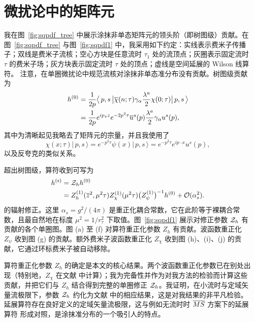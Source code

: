 \section{\label{sec:pertth}微扰论中的矩阵元}

我在图~\ref{fig:sqpdf_tree} 中展示涂抹非单态矩阵元的领头阶（即树图级）贡献。在图~\ref{fig:sqpdf_tree} 与图~\ref{fig:sqpdf1} 中，我采用如下约定：实线表示费米子传播子；双线是费米子流核；空心方块是任意流时 $\tau_1$ 处的流顶点；灰圈表示固定流时 $\tau$ 的费米子场；灰方块表示固定流时 $\tau$ 处的顶点；虚线是空间延展的 Wilson 线算符。
注意，在单圈微扰论中规范流核对涂抹非单态准分布没有贡献。树图级贡献为
\begin{align}
h^{(0)} = {} & \frac{1}{2p}\big\langle  \,p,s \,\big| \overline{\chi}(n;\tau)\gamma_\alpha\frac{\lambda^a}{2}\chi(0;\tau) \big|\, p,s \, \big\rangle \nonumber\\
= {} & \frac{1}{2p}e^{ip_zz} e^{-2p^2\tau}\overline{u}^s(p)\frac{\lambda^a}{2}\gamma_\alpha u^s(p),
\end{align}
其中为清晰起见我略去了矩阵元的宗量，并且我使用了
\begin{equation}
\chi(x;\tau) \big | \,p,s \,\big\rangle = e^{-p^2\tau}\psi(x)\big | \,p,s \,\big\rangle =e^{-p^2\tau}e^{ip\cdot x}u^s(p),
\end{equation}
以及反夸克的类似关系。

超出树图级，算符收到可写为
\begin{align}
h^{(\mathrm{s})}= {} & {\cal Z}_h h^{(0)} \nonumber\\
= {} & Z_h^{(1)}(\overline{z}^2,\mu^2\tau) Z_\chi^{(1)}(\mu^2\tau) \big(Z_\psi^{(1)}\big)^{-1}h^{(0)}+{\cal O}(\alpha_s^2). \label{eq:matchrel}
\end{align}
的辐射修正。这里 $\alpha_s = g^2/(4\pi)$ 是重正化耦合常数，它在此阶等于裸耦合常数，且最自然地在标度 $\mu^2 = 1/r_\tau^2$ 下取值。图~\ref{fig:sqpdf1} 展示对修正参数 ${\cal Z}_h$ 有贡献的各个单圈图。图 (a) 至 (f) 对算符重正化参数 $Z_h$ 有贡献。波函数重正化 $Z_\psi$ 收到图 (g) 的贡献。额外费米子波函数重正化 $Z_\chi$ 收到图 (h)、(i)、(j) 的贡献，它通过环标费米子被自动移除。

算符重正化参数 $Z_h$ 的确定是本文的核心结果。两个波函数重正化参数已在别处出现（特别地，$Z_\chi$ 在文献 \cite{Luscher:2013cpa,Makino:2014taa} 中计算）；我为完备性并作为对我方法的检验而计算这些贡献，并把它们与 $Z_h$ 结合得到完整的单圈修正 ${\cal Z}_h$。我证明，在小流时与定域矢量流极限下，参数 ${\cal Z}_h$ 约化为文献 \cite{Makino:2014taa,Hieda:2016lly} 中的相应结果，这是对我结果的非平凡检验。延展算符存在良好定义的定域矢量流极限，这与例如无流时时 $\overline{MS}$ 方案下的延展算符 \cite{Constantinou:2017sej} 形成对照，是涂抹准分布的一个吸引人的特点。

